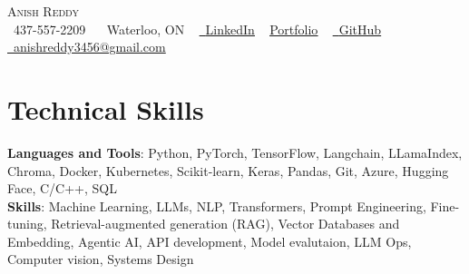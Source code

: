 \documentclass[letterpaper,11pt]{article}
\begin{document}
\begin{center}
    {\Huge \scshape Anish Reddy} \\ \vspace{2pt}
    \small
    \raisebox{-0.1\height}\faPhone\ 437-557-2209 ~
    \raisebox{-0.1\height}\faBuilding\ Waterloo, ON ~
     \href{https://www.linkedin.com/in/anishreddyk/}{\faLinkedin\ \underline{LinkedIn}}  ~
    \href{https://www.anishreddy.tech/}{\raisebox{-0.1\height}{\faGlobe} \underline{Portfolio}} ~
    \href{https://github.com/Anish-Reddy-K/}{\faGithub\ \underline{GitHub}}  ~
    \href{mailto:anishreddy3456@gmail.com}{\faEnvelope\ 
    anishreddy3456@gmail.com} ~ 
    \vspace{-8pt}
\end{center}


\section{Technical Skills}
 \begin{itemize}[leftmargin=0.05in, label={}]
    \small{\item{
     \textbf{Languages and Tools}{: Python, PyTorch, TensorFlow, Langchain, LLamaIndex, Chroma, Docker, Kubernetes, Scikit-learn, Keras, Pandas, Git, Azure, Hugging Face, C/C++, SQL} \\
     \textbf{Skills}{: Machine Learning, LLMs, NLP, Transformers, Prompt Engineering, Fine-tuning, Retrieval-augmented generation (RAG), Vector Databases and Embedding, Agentic AI, API development, Model evalutaion, LLM Ops, Computer vision, Systems Design}\\
    }}
 \end{itemize}
 \vspace{-16pt}

\end{document}
